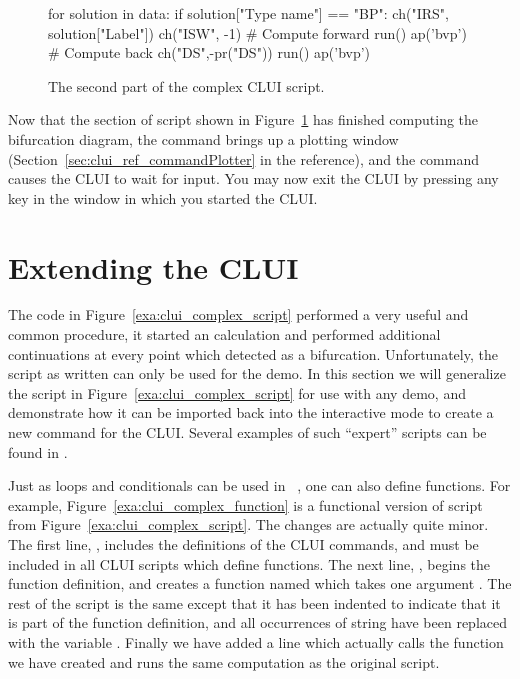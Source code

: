\documentclass[12pt]{report}
\begin{document}
 \begin{figure}[htbp]
 {\small \begin{center} \begin{boxedverbatim}
 for solution in data:
     if solution["Type name"] == "BP":
         ch("IRS", solution["Label"])
         ch("ISW", -1)
         # Compute forward
         run()
         ap('bvp')
         # Compute back
         ch("DS",-pr("DS"))
         run()
         ap('bvp')
 \end{boxedverbatim}
 \end{center} 
 }
 \caption[The second part of the  complex \AUTO CLUI script.]
 {The second part of the  complex \AUTO CLUI script.}
 \label{exa:clui_complex_third}
 \end{figure}

 Now that the section of script shown in 
 Figure~\ref{exa:clui_complex_third} has finished computing the
 bifurcation diagram, the command 
 brings up a plotting window 
 (Section~\ref{sec:clui_ref_commandPlotter} in the reference),
 and the command  causes the \AUTO CLUI
 to wait for input.  You may now exit the \AUTO CLUI
 by pressing any key in the window in which you started
 the \AUTO CLUI.

 \section{ Extending the \AUTO CLUI } \label{sec:clui_extending}

 The code in Figure~\ref{exa:clui_complex_script}
 performed a very useful and common procedure, it started an \AUTO
 calculation and performed additional continuations
 at every point which \AUTO detected as a bifurcation.
 Unfortunately, the script as written can only be used
 for the  demo.  In this section we will 
 generalize the script in Figure~\ref{exa:clui_complex_script}
 for use with any demo, and demonstrate how it
 can be imported back into the interactive
 mode to create a new command
 for the \AUTO CLUI.  Several examples of such
 ``expert'' scripts can be found in .

 Just as loops and conditionals can be used in \python~,
 one can also define functions.  For example,
 Figure~\ref{exa:clui_complex_function} is a
 functional version of script from 
 Figure~\ref{exa:clui_complex_script}.
 The changes are actually quite minor.  
 The first line, ,
 includes the definitions of the \AUTO CLUI commands,
 and must be included in all \AUTO CLUI scripts
 which define functions.
 The next line, 
 ,
 begins the function definition, and 
 creates a function named  which
 takes one argument .  The
 rest of the script is the same except that it
 has been indented to indicate that it is
 part of the function definition, and all occurrences
 of string  have been replaced
 with the variable .
 Finally we have added a line 
 which actually calls the function we have 
 created and runs the same computation as
 the original script.
\end{document}
